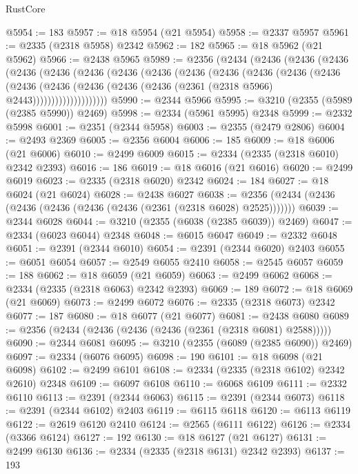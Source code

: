 \begin{lexlean}{RustCore}
\begin{coremodule}
@5954 := 183
@5957 := @18 @5954 (@21 @5954)
@5958 := @2337 @5957
@5961 := @2335 (@2318 @5958) @2342
@5962 := 182
@5965 := @18 @5962 (@21 @5962)
@5966 := @2438 @5965
@5989 := @2356
    (@2434
      (@2436
        (@2436
          (@2436
            (@2436
              (@2436
                (@2436
                  (@2436
                    (@2436
                      (@2436
                        (@2436
                          (@2436
                            (@2436
                              (@2436
                                (@2436
                                  (@2436
                                    (@2436
                                      (@2436 (@2436 (@2361 (@2318 @5966) @2443))))))))))))))))))))
@5990 := @2344 @5966
@5995 := @3210 (@2355 (@5989 (@2385 @5990)) @2469)
@5998 := @2334 (@5961 @5995) @2348
@5999 := @2332 @5998
@6001 := @2351 (@2344 @5958)
@6003 := @2355 (@2479 @2806)
@6004 := @2493 @2369
@6005 := @2356 @6004
@6006 := 185
@6009 := @18 @6006 (@21 @6006)
@6010 := @2499 @6009
@6015 := @2334 (@2335 (@2318 @6010) @2342 @2393)
@6016 := 186
@6019 := @18 @6016 (@21 @6016)
@6020 := @2499 @6019
@6023 := @2335 (@2318 @6020) @2342
@6024 := 184
@6027 := @18 @6024 (@21 @6024)
@6028 := @2438 @6027
@6038 := @2356 (@2434 (@2436 (@2436 (@2436 (@2436 (@2436 (@2361 (@2318 @6028) @2525)))))))
@6039 := @2344 @6028
@6044 := @3210 (@2355 (@6038 (@2385 @6039)) @2469)
@6047 := @2334 (@6023 @6044) @2348
@6048 := @6015 @6047
@6049 := @2332 @6048
@6051 := @2391 (@2344 @6010)
@6054 := @2391 (@2344 @6020) @2403
@6055 := @6051 @6054
@6057 := @2549 @6055 @2410
@6058 := @2545 @6057
@6059 := 188
@6062 := @18 @6059 (@21 @6059)
@6063 := @2499 @6062
@6068 := @2334 (@2335 (@2318 @6063) @2342 @2393)
@6069 := 189
@6072 := @18 @6069 (@21 @6069)
@6073 := @2499 @6072
@6076 := @2335 (@2318 @6073) @2342
@6077 := 187
@6080 := @18 @6077 (@21 @6077)
@6081 := @2438 @6080
@6089 := @2356 (@2434 (@2436 (@2436 (@2436 (@2361 (@2318 @6081) @2588)))))
@6090 := @2344 @6081
@6095 := @3210 (@2355 (@6089 (@2385 @6090)) @2469)
@6097 := @2334 (@6076 @6095)
@6098 := 190
@6101 := @18 @6098 (@21 @6098)
@6102 := @2499 @6101
@6108 := @2334 (@2335 (@2318 @6102) @2342 @2610) @2348
@6109 := @6097 @6108
@6110 := @6068 @6109
@6111 := @2332 @6110
@6113 := @2391 (@2344 @6063)
@6115 := @2391 (@2344 @6073)
@6118 := @2391 (@2344 @6102) @2403
@6119 := @6115 @6118
@6120 := @6113 @6119
@6122 := @2619 @6120 @2410
@6124 := @2565 (@6111 @6122)
@6126 := @2334 (@3366 @6124)
@6127 := 192
@6130 := @18 @6127 (@21 @6127)
@6131 := @2499 @6130
@6136 := @2334 (@2335 (@2318 @6131) @2342 @2393)
@6137 := 193

\end{coremodule}
\end{lexlean}
